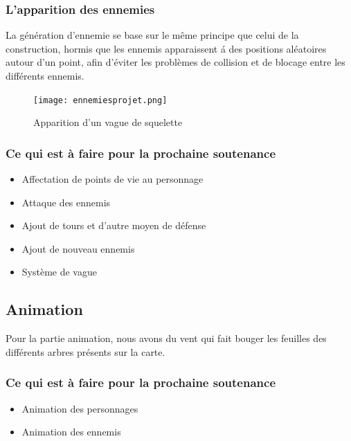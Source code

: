 \documentclass[a4paper, 12pt]{article}
\begin{document}
		
		\subsubsection{L'apparition des ennemies}
	
		La génération d'ennemie se base sur le même principe que celui de la construction, hormis que les ennemis apparaissent \'a des positions aléatoires autour d'un point, afin d'éviter les problèmes de collision et de blocage entre les différents ennemis. \\
	\begin{figure}[!ht]
		\centerline{\texttt{[image: ennemiesprojet.png]}}
		\caption*{Apparition d'un vague de squelette}
	\end{figure}

	\subsubsection*{Ce qui est à faire pour la prochaine soutenance}	
	\begin{itemize}
	\item Affectation de points de vie au personnage
	\item Attaque des ennemis
	\item Ajout de tours et d'autre moyen de d\'efense
	\item Ajout de nouveau ennemis 
	\item Système de vague
	\end{itemize}

	\subsection{Animation}
	Pour la partie animation, nous avons du vent qui fait bouger les feuilles des différents arbres présents sur la carte.

\subsubsection*{Ce qui est à faire pour la prochaine soutenance}
\begin{itemize}
\item Animation des personnages
\item Animation des ennemis
\end{itemize}
\end{document}
